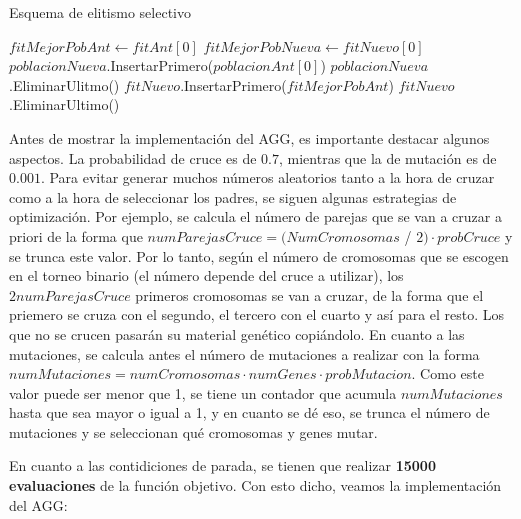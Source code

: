 \documentclass[11pt,a4paper]{article}
\begin{document}
\begin{algorithm}[H]
\caption{Esquema de elitismo selectivo}
\begin{algorithmic}[1]
\State $fitMejorPobAnt \gets fitAnt[0]$
\State $fitMejorPobNueva \gets fitNuevo[0]$
	\State $poblacionNueva$.InsertarPrimero($poblacionAnt[0]$)
	\State $poblacionNueva$.EliminarUlitmo()
	\State $fitNuevo$.InsertarPrimero($fitMejorPobAnt$)
	\State $fitNuevo$.EliminarUltimo()
\EndIf
\EndProcedure
\end{algorithmic}
\end{algorithm}

Antes de mostrar la implementación del AGG, es importante destacar algunos aspectos. La probabilidad de cruce es de $0.7$,
mientras que la de mutación es de $0.001$. Para evitar generar muchos números aleatorios tanto a la hora de cruzar como a la
hora de seleccionar los padres, se siguen algunas estrategias de optimización. Por ejemplo, se calcula el número de parejas
que se van a cruzar a priori de la forma que $numParejasCruce = (NumCromosomas$ / $2) \cdot probCruce$ y se trunca este valor.
Por lo tanto, según el número de cromosomas que se escogen en el torneo binario (el número depende del cruce a utilizar), los
$2numParejasCruce$ primeros cromosomas se van a cruzar, de la forma que el priemero se cruza con el segundo, el tercero con el
cuarto y así para el resto. Los que no se crucen pasarán su material genético copiándolo. En cuanto a las mutaciones, se calcula
antes el número de mutaciones a realizar con la forma $numMutaciones = numCromosomas \cdot numGenes \cdot probMutacion$. Como
este valor puede ser menor que 1, se tiene un contador que acumula $numMutaciones$ hasta que sea mayor o igual a 1, y en cuanto
se dé eso, se trunca el número de mutaciones y se seleccionan qué cromosomas y genes mutar.

En cuanto a las contidiciones de parada, se tienen que realizar \textbf{15000 evaluaciones} de la función objetivo.
Con esto dicho, veamos la implementación del AGG:
\end{document}
